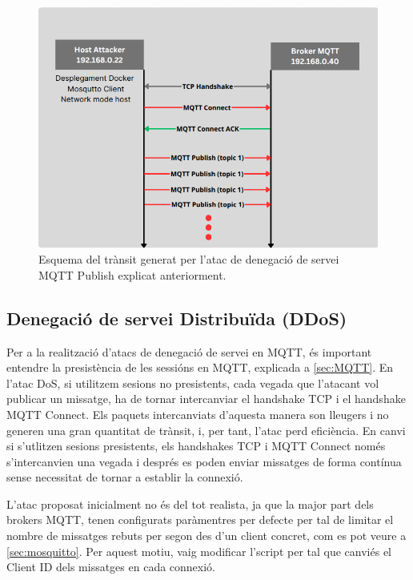   \begin{figure}[H]
    \centering
    \includegraphics[width=1\textwidth]{img/DoSsimple.png}
    \caption{Esquema del trànsit generat per l'atac de denegació de servei MQTT Publish explicat anteriorment.}
    \label{fig:DoSsimple}
  \end{figure}


  \subsection{Denegació de servei Distribuïda (DDoS)}

Per a la realització d'atacs de denegació de servei en MQTT, és important entendre la presistència de les sessións en MQTT, explicada a \ref{sec:MQTT}. En l'atac DoS, si utilitzem sesions no presistents, cada vegada que l'atacant vol publicar un missatge, ha de tornar intercanviar el handshake TCP i el handshake MQTT Connect. Els paquets intercanviats d'aquesta manera son lleugers i no generen una gran quantitat de trànsit, i, per tant, l'atac perd eficiència. En canvi si s'utlitzen sesions presistents, els handshakes TCP i MQTT Connect només s'intercanvien una vegada i després es poden enviar missatges de forma contínua sense necessitat de tornar a establir la connexió.

L'atac proposat inicialment no és del tot realista, ja que la major part dels brokers MQTT, tenen configurats paràmentres per defecte per tal de limitar el nombre de missatges rebuts per segon des d'un client concret, com es pot veure a \ref{sec:mosquitto}. Per aquest motiu, vaig modificar l'script per tal que canviés el Client ID dels missatges en cada connexió.

